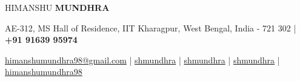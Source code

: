 \documentclass[10pt]{article}
\begin{document}
\begin{center}
    {\Huge HIMANSHU \textbf{MUNDHRA}}\\[0.7ex]
\end{center}
\vspace{-3.5ex}
\begin{center}
    {\small AE-312, MS Hall of Residence, IIT Kharagpur, West Bengal, India - 721 302 | \faMobile\hspace{0.2ex} \textbf{+91 91639 95974} }
\end{center}
\vspace{-3.8ex}
\begin{center}
    \Letter\hspace{0.2ex}
    \href{mailto:himanshumundhra98@gmail.com}{\small himanshumundhra98@gmail.com} |
    \faLinkedinSquare\hspace{0.2ex}     \href{https://www.linkedin.com/in/shmundhra/}{\small shmundhra} | 
    \faGithub\hspace{0.2ex} \href{https://github.com/shmundhra/}{\small shmundhra} |
    \faCode\hspace{0.2ex}     \href{https://www.stopstalk.com/user/profile/shmundhra/}{\small shmundhra} | 
    \faMedium\hspace{0.2ex}     
    \href{https://medium.com/@himanshumundhra98}{\small himanshumundhra98}
\end{center}
\end{document}
